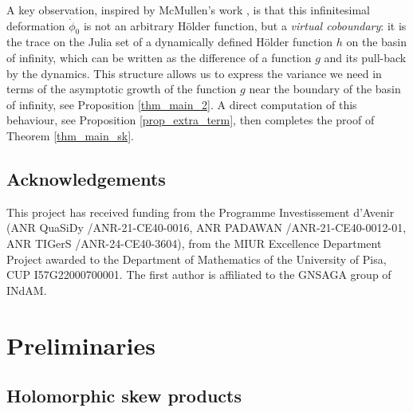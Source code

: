 \documentclass[11pt]{amsart}
\theoremstyle{plain}
\theoremstyle{definition}
\theoremstyle{remark}
\begin{document}
A key observation, inspired by McMullen’s work
\cite{McMullen08}, is that this infinitesimal deformation
$\dot \phi_0$ 
is
not an arbitrary H\"older function, but a \emph{virtual coboundary}: it
is the trace on the Julia set 
of a
dynamically defined H\"older function $h$
 on the basin of infinity, which
 can be written as
the difference of a function $g$ 
and its pull-back by the dynamics. 
This structure allows us to express the variance we need
in terms of the
asymptotic growth of the function $g$ near the boundary of the basin of infinity, see 
Proposition \ref{thm_main_2}.
A direct computation of this behaviour, see Proposition \ref{prop_extra_term},
 then completes the proof of Theorem \ref{thm_main_sk}.



\subsection*{Acknowledgements}
This project has received funding from
 the
 Programme
 Investissement d'Avenir
(ANR QuaSiDy /ANR-21-CE40-0016,
ANR PADAWAN /ANR-21-CE40-0012-01,
ANR TIGerS /ANR-24-CE40-3604),
 from the MIUR Excellence Department Project awarded to the Department of Mathematics of the University of Pisa, CUP I57G22000700001.
The first
author is affiliated to the GNSAGA group of INdAM.




\section{Preliminaries}\label{sec_prel}


\subsection{Holomorphic skew products}\label{sec_fibered}
\end{document}
